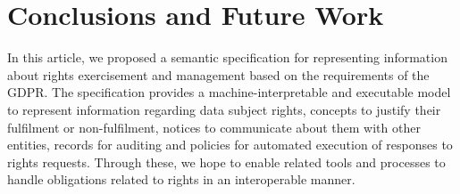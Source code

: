 \documentclass{IOS-Book-Article}     %
\begin{document}
\section{Conclusions and Future Work}
\label{sec:conclusions}

In this article, we proposed a semantic specification for representing information about rights exercisement and management based on the requirements of the GDPR.
The specification provides a machine-interpretable and executable model to represent information regarding data subject rights, concepts to justify their fulfilment or non-fulfilment, notices to communicate about them with other entities, records for auditing and policies for automated execution of responses to rights requests.
Through these, we hope to enable related tools and processes to handle obligations related to rights in an interoperable manner. 



\end{document}
